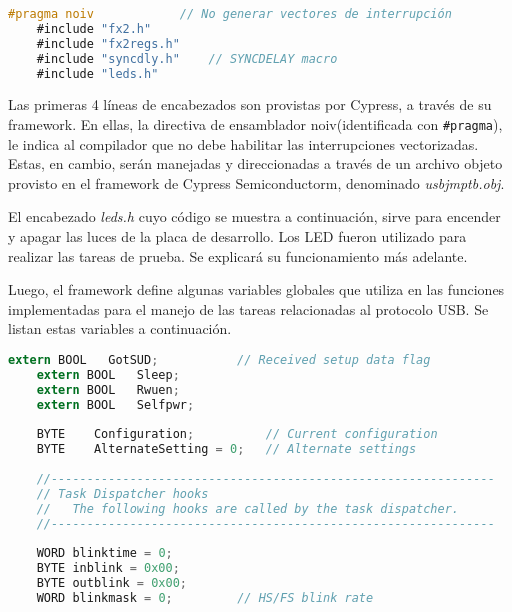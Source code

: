 	\begin{lstlisting}[language=C,backgroundcolor=\color{gray!30}]
	#pragma noiv			// No generar vectores de interrupción
	#include "fx2.h"
	#include "fx2regs.h"
	#include "syncdly.h"	// SYNCDELAY macro
	#include "leds.h"
	\end{lstlisting}
	
	Las primeras 4 líneas de encabezados son provistas por Cypress, a través de su framework. En ellas, la directiva de ensamblador noiv(identificada con \verb|#pragma|), le indica al compilador que no debe habilitar las interrupciones vectorizadas. Estas, en cambio, serán manejadas y direccionadas a través de un archivo objeto provisto en el framework de Cypress Semiconductorm, denominado {\it usbjmptb.obj}.%
	
	El encabezado {\it leds.h} cuyo código se muestra a continuación, sirve para encender y apagar las luces de la placa de desarrollo. Los LED fueron utilizado para realizar las tareas de prueba. Se explicará su funcionamiento más adelante.%
	
	
	Luego, el framework define algunas variables globales que utiliza en las funciones implementadas para el manejo de las tareas relacionadas al protocolo USB. Se listan estas variables a continuación.
	
	\begin{lstlisting}[language=C,backgroundcolor=\color{gray!30}]
	extern BOOL   GotSUD;			// Received setup data flag
	extern BOOL   Sleep;
	extern BOOL   Rwuen;
	extern BOOL   Selfpwr;
	
	BYTE    Configuration;      	// Current configuration
	BYTE    AlternateSetting = 0;   // Alternate settings
	
	//--------------------------------------------------------------
	// Task Dispatcher hooks
	//   The following hooks are called by the task dispatcher.
	//--------------------------------------------------------------
	
	WORD blinktime = 0;
	BYTE inblink = 0x00;
	BYTE outblink = 0x00;
	WORD blinkmask = 0;			// HS/FS blink rate
	\end{lstlisting}
	

